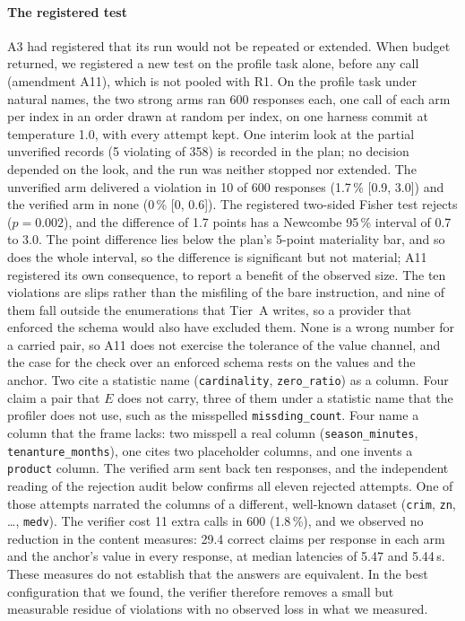 \documentclass[journal]{IEEEtran}
\begin{document}
\paragraph{The registered test}
A3 had registered that its run would not be repeated or extended. When budget
returned, we registered a new test on the profile task alone, before any call
(amendment A11), which is not pooled with R1. On the profile task under natural
names, the two strong arms ran 600 responses each, one call of each arm per
index in an order drawn at random per index, on one harness commit at
temperature 1.0, with every attempt kept. One interim look at the partial
unverified records (5 violating of 358) is recorded in the plan; no decision
depended on the look, and the run was neither stopped nor extended. The unverified arm delivered a violation in 10 of 600
responses (1.7\,\% [0.9, 3.0]) and the verified arm in none (0\,\% [0, 0.6]).
The registered two-sided Fisher test rejects ($p=0.002$), and the difference
of 1.7 points has a Newcombe 95\,\% interval of 0.7 to 3.0. The point
difference lies below the plan's 5-point materiality bar, and so does the whole
interval, so the difference is significant but not material; A11 registered its own consequence, to report a benefit of the
observed size. The ten violations are slips rather than the misfiling of the
bare instruction, and nine of them fall outside the enumerations that Tier~A
writes, so a provider that enforced the schema would also have excluded them.
None is a wrong number for a carried pair, so A11 does not exercise the
tolerance of the value channel, and the case for the check over an enforced
schema rests on the values and the anchor. Two cite a
statistic name (\texttt{cardinality}, \texttt{zero\_ratio}) as a column. Four
claim a pair that $E$ does not carry, three of them under a statistic name that
the profiler does not use, such as the misspelled \texttt{missding\_count}.
Four name a column that the frame lacks: two misspell a real column
(\texttt{season\_minutes}, \texttt{tenanture\_months}), one cites two
placeholder columns, and one invents a \texttt{product} column. The verified
arm sent back
ten responses, and the independent reading of the rejection audit below
confirms all eleven rejected attempts. One of those attempts narrated the
columns of a different, well-known dataset (\texttt{crim}, \texttt{zn},
\ldots, \texttt{medv}). The verifier cost 11 extra calls in 600 (1.8\,\%), and
we observed no reduction in the content measures: 29.4 correct claims per
response in each arm and the anchor's value in every response, at median
latencies of 5.47 and 5.44\,s. These measures do not establish that the
answers are equivalent. In the best configuration that we found, the verifier
therefore removes a small but measurable residue of violations with no
observed loss in what we measured.
\end{document}
